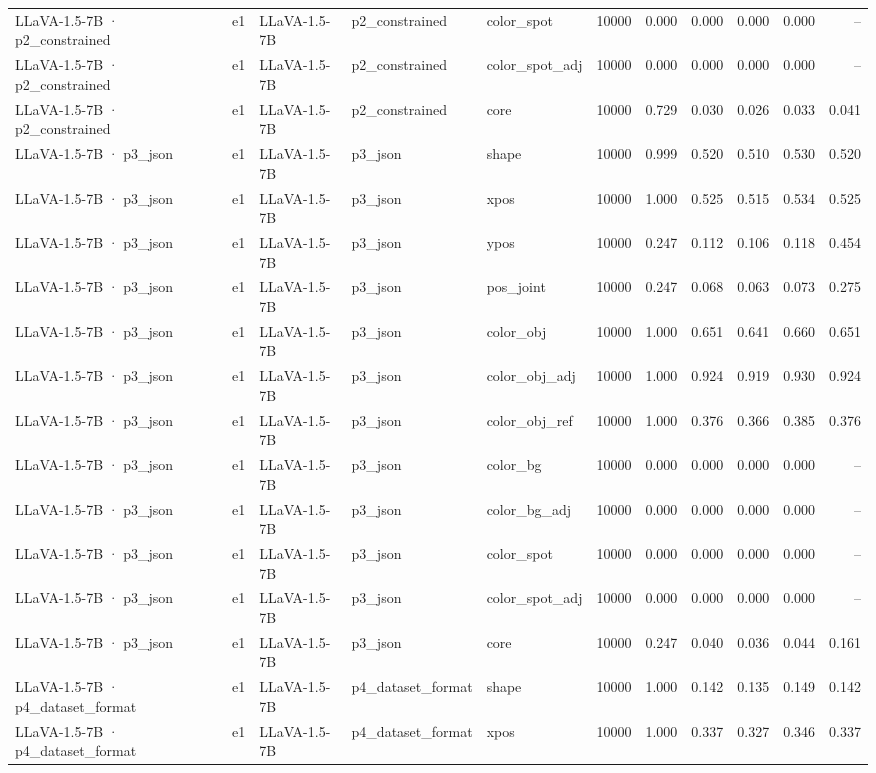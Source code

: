 \begin{tabular}{lllllrrrrrr}
LLaVA-1.5-7B · p2\_constrained & e1 & LLaVA-1.5-7B & p2\_constrained & color\_spot & 10000 & 0.000 & 0.000 & 0.000 & 0.000 & -- \\
LLaVA-1.5-7B · p2\_constrained & e1 & LLaVA-1.5-7B & p2\_constrained & color\_spot\_adj & 10000 & 0.000 & 0.000 & 0.000 & 0.000 & -- \\
LLaVA-1.5-7B · p2\_constrained & e1 & LLaVA-1.5-7B & p2\_constrained & core & 10000 & 0.729 & 0.030 & 0.026 & 0.033 & 0.041 \\
LLaVA-1.5-7B · p3\_json & e1 & LLaVA-1.5-7B & p3\_json & shape & 10000 & 0.999 & 0.520 & 0.510 & 0.530 & 0.520 \\
LLaVA-1.5-7B · p3\_json & e1 & LLaVA-1.5-7B & p3\_json & xpos & 10000 & 1.000 & 0.525 & 0.515 & 0.534 & 0.525 \\
LLaVA-1.5-7B · p3\_json & e1 & LLaVA-1.5-7B & p3\_json & ypos & 10000 & 0.247 & 0.112 & 0.106 & 0.118 & 0.454 \\
LLaVA-1.5-7B · p3\_json & e1 & LLaVA-1.5-7B & p3\_json & pos\_joint & 10000 & 0.247 & 0.068 & 0.063 & 0.073 & 0.275 \\
LLaVA-1.5-7B · p3\_json & e1 & LLaVA-1.5-7B & p3\_json & color\_obj & 10000 & 1.000 & 0.651 & 0.641 & 0.660 & 0.651 \\
LLaVA-1.5-7B · p3\_json & e1 & LLaVA-1.5-7B & p3\_json & color\_obj\_adj & 10000 & 1.000 & 0.924 & 0.919 & 0.930 & 0.924 \\
LLaVA-1.5-7B · p3\_json & e1 & LLaVA-1.5-7B & p3\_json & color\_obj\_ref & 10000 & 1.000 & 0.376 & 0.366 & 0.385 & 0.376 \\
LLaVA-1.5-7B · p3\_json & e1 & LLaVA-1.5-7B & p3\_json & color\_bg & 10000 & 0.000 & 0.000 & 0.000 & 0.000 & -- \\
LLaVA-1.5-7B · p3\_json & e1 & LLaVA-1.5-7B & p3\_json & color\_bg\_adj & 10000 & 0.000 & 0.000 & 0.000 & 0.000 & -- \\
LLaVA-1.5-7B · p3\_json & e1 & LLaVA-1.5-7B & p3\_json & color\_spot & 10000 & 0.000 & 0.000 & 0.000 & 0.000 & -- \\
LLaVA-1.5-7B · p3\_json & e1 & LLaVA-1.5-7B & p3\_json & color\_spot\_adj & 10000 & 0.000 & 0.000 & 0.000 & 0.000 & -- \\
LLaVA-1.5-7B · p3\_json & e1 & LLaVA-1.5-7B & p3\_json & core & 10000 & 0.247 & 0.040 & 0.036 & 0.044 & 0.161 \\
LLaVA-1.5-7B · p4\_dataset\_format & e1 & LLaVA-1.5-7B & p4\_dataset\_format & shape & 10000 & 1.000 & 0.142 & 0.135 & 0.149 & 0.142 \\
LLaVA-1.5-7B · p4\_dataset\_format & e1 & LLaVA-1.5-7B & p4\_dataset\_format & xpos & 10000 & 1.000 & 0.337 & 0.327 & 0.346 & 0.337 \\

\end{tabular}
